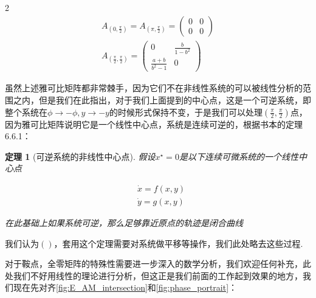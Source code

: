 \documentclass{CLGPY}
\newtheorem{thm}{定理}
\begin{document}
\begin{multicols}{2}
		\begin{align*}
		A_{(0,\frac{\pi}{2})} = A_{(\pi,\frac{\pi}{2})} = \begin{pmatrix}
			0 & 0 \\
			0 & 0 
		\end{pmatrix} \\
		A_{(\frac{\pi}{2},\frac{\pi}{2})} = \begin{pmatrix}
			0 & \frac{b}{1-b^2} \\
			\frac{a+b}{b^2-1} & 0
		\end{pmatrix}
		\end{align*}
		
		虽然上述雅可比矩阵都非常棘手，因为它们不在非线性系统的可以被线性分析的范围之内，但是我们在此指出，对于我们上面提到的中心点，这是一个可逆系统\cite{2024_Strogatz_BOOK}，即整个系统在$\phi \longrightarrow -\phi, y \longrightarrow -y$的时候形式保持不变，于是我们可以处理$(\frac{\pi}{2},\frac{\pi}{2})$点，因为雅可比矩阵说明它是一个线性中心点，系统是连续可逆的，根据书本\cite{2024_Strogatz_BOOK}的定理6.6.1：
		
		\begin{thm}[可逆系统的非线性中心点]
			
			{\kaishu 假设$x^\star = 0$是以下连续可微系统的一个线性中心点}
			
			\begin{align*}
				& \dot{x} = f(x,y) \\
				& \dot{y} = g(x,y)
			\end{align*}
			
			{\kaishu 在此基础上如果系统可逆，那么足够靠近原点的轨迹是闭合曲线}
		\end{thm}
		
		我们认为$()$，套用这个定理需要对系统做平移等操作，我们此处略去这些过程.
		
		对于鞍点，全零矩阵的特殊性需要进一步深入的数学分析，我们欢迎任何补充，此处我们不好用线性的理论进行分析，但这正是我们前面的工作起到效果的地方，我们现在先对齐\autoref{fig:E_AM_intersection}和\autoref{fig:phase_portrait}：
		

\end{multicols}
\end{document}
